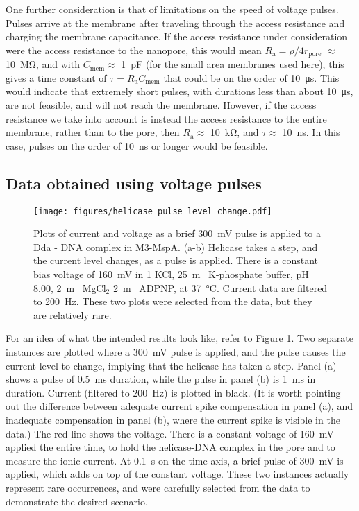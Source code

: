 One further consideration is that of limitations on the speed of voltage pulses.  Pulses arrive at the membrane after traveling through the access resistance and charging the membrane capacitance.  If the access resistance under consideration were the access resistance to the nanopore, this would mean $R_{\text{a}} = \rho / 4 r_{\text{pore}}$ \citep{Hall1975} $ \approx $ \SI{10}{\mega\ohm}, and with $C_{\text{mem}} \approx $ \SI{1}{\pico\F} (for the small area membranes used here), this gives a time constant of $\tau = R_{\text{a}} C_{\text{mem}}$ that could be on the order of \SI{10}{\micro\s}.  This would indicate that extremely short pulses, with durations less than about \SI{10}{\micro\s}, are not feasible, and will not reach the membrane.  However, if the access resistance we take into account is instead the access resistance to the entire membrane, rather than to the pore, then $R_{\text{a}} \approx $ \SI{10}{\kilo\ohm}, and $\tau \approx $ \SI{10}{\ns}.  In this case, pulses on the order of \SI{10}{\ns} or longer would be feasible.

\subsection{Data obtained using voltage pulses}

\begin{figure}[h]
\begin{centering}
\texttt{[image: figures/helicase\_pulse\_level\_change.pdf]}
\caption[Voltage pulse can induce a helicase step]{Plots of current and voltage as a brief \SI{300}{\mV} pulse is applied to a Dda - DNA complex in  M3-MspA.  (a-b) Helicase takes a step, and the current level changes, as a pulse is applied.  There is a constant bias voltage of \SI{160}{\mV} in \SI{1}{\Molar} KCl, \SI{25}{\m\Molar} K-phosphate buffer, pH \num{8.00}, \SI{2}{\m\Molar} MgCl$_2$ \SI{2}{\m\Molar} ADPNP, at \SI{37}{\celsius}.  Current data are filtered to \SI{200}{\Hz}.  These two plots were selected from the data, but they are relatively rare.}
\label{fig:helicase_pulse}
\end{centering}
\end{figure}

For an idea of what the intended results look like, refer to Figure \ref{fig:helicase_pulse}.  Two separate instances are plotted where a \SI{300}{\mV} pulse is applied, and the pulse causes the current level to change, implying that the helicase has taken a step.  Panel (a) shows a pulse of \SI{0.5}{\ms} duration, while the pulse in panel (b) is \SI{1}{\ms} in duration.  Current (filtered to \SI{200}{\Hz}) is plotted in black.  (It is worth pointing out the difference between adequate current spike compensation in panel (a), and inadequate compensation in panel (b), where the current spike is visible in the data.)  The red line shows the voltage.  There is a constant voltage of \SI{160}{\mV} applied the entire time, to hold the helicase-DNA complex in the pore and to measure the ionic current.  At \SI{0.1}{\s} on the time axis, a brief pulse of \SI{300}{\mV} is applied, which adds on top of the constant voltage.  These two instances actually represent rare occurrences, and were carefully selected from the data to demonstrate the desired scenario.

